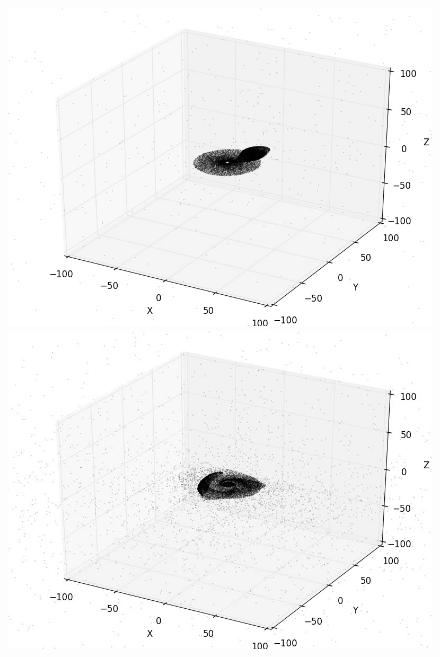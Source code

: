 \documentclass[10pt,letterpaper]{article}
\begin{document}
\begin{figure}[!htb]
  \includegraphics[width=\linewidth]{figures/galaxy_collisions/rk4_parabolic_orbit_10000_particles_counterclockwise_fig1.png}
  \subcaption{}\label{fig:rk4_parabolic_orbit_10000_particles_counterclockwise_fig1}
\endminipage\hfill
{}
  \includegraphics[width=\linewidth]{figures/galaxy_collisions/rk4_parabolic_orbit_10000_particles_counterclockwise_fig2.png}
  \subcaption{}\label{fig:rk4_parabolic_orbit_10000_particles_counterclockwise_fig2}
\endminipage\hfill
{}%

\end{figure}
\end{document}
